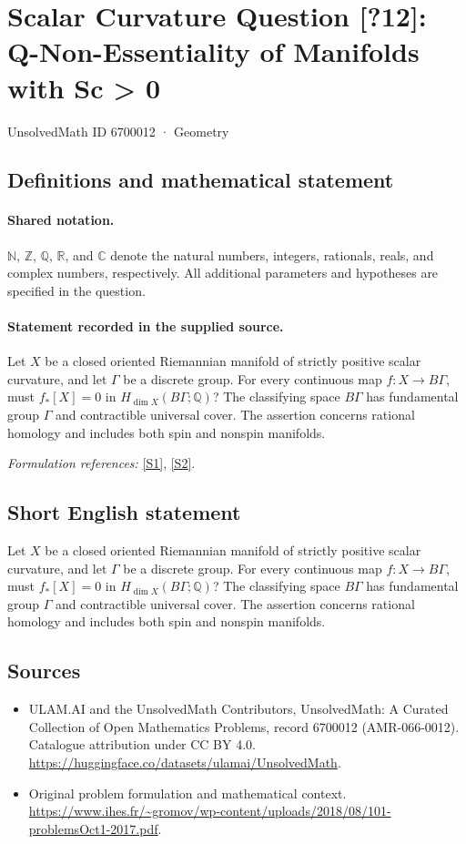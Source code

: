 \documentclass[11pt]{article}
\newcommand{\sref}[2]{\hyperlink{source:#1:#2}{[S#2]}}
\begin{document}
\setcounter{section}{6700011}
\section{Scalar Curvature Question [?12]: Q-Non-Essentiality of Manifolds with Sc > 0}\label{6700012}
{\small UnsolvedMath ID 6700012 · Geometry}
\subsection{Definitions and mathematical statement}

\paragraph{Shared notation.}$\mathbb N$, $\mathbb Z$, $\mathbb Q$, $\mathbb R$, and $\mathbb C$ denote the natural numbers, integers, rationals, reals, and complex numbers, respectively. All additional parameters and hypotheses are specified in the question.


\paragraph{Statement recorded in the supplied source.}
Let $X$ be a closed oriented Riemannian manifold of strictly positive scalar curvature, and let $\Gamma$ be a discrete group. For every continuous map $f:X\to B\Gamma$, must $f_*[X]=0$ in $H_{\dim X}(B\Gamma;\mathbb Q)$? The classifying space $B\Gamma$ has fundamental group $\Gamma$ and contractible universal cover. The assertion concerns rational homology and includes both spin and nonspin manifolds.
\par\smallskip\textit{Formulation references:} \sref{6700012}{1}, \sref{6700012}{2}.
\subsection{Short English statement}
Let $X$ be a closed oriented Riemannian manifold of strictly positive scalar curvature, and let $\Gamma$ be a discrete group. For every continuous map $f:X\to B\Gamma$, must $f_*[X]=0$ in $H_{\dim X}(B\Gamma;\mathbb Q)$? The classifying space $B\Gamma$ has fundamental group $\Gamma$ and contractible universal cover. The assertion concerns rational homology and includes both spin and nonspin manifolds.
\subsection{Sources}
\begin{itemize}
\item[\hypertarget{source:6700012:1}{S1}] ULAM.AI and the UnsolvedMath Contributors, UnsolvedMath: A Curated Collection of Open Mathematics Problems, record 6700012 (AMR-066-0012). Catalogue attribution under CC BY 4.0.
\url{https://huggingface.co/datasets/ulamai/UnsolvedMath}.
\item[\hypertarget{source:6700012:2}{S2}] Original problem formulation and mathematical context.
\url{https://www.ihes.fr/~gromov/wp-content/uploads/2018/08/101-problemsOct1-2017.pdf}.
\end{itemize}
\label{end:6700012}
\end{document}
